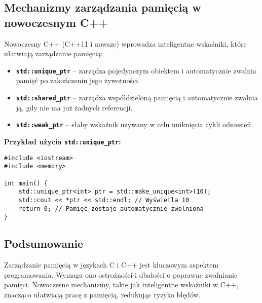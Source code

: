 \subsection{Mechanizmy zarządzania pamięcią w nowoczesnym C++}
Nowoczesny C++ (C++11 i nowsze) wprowadza inteligentne wskaźniki, które ułatwiają zarządzanie pamięcią:

\begin{itemize}
    \item \textbf{\texttt{std::unique\_ptr}} – zarządza pojedynczym obiektem i automatycznie zwalnia pamięć po zakończeniu jego żywotności.
    \item \textbf{\texttt{std::shared\_ptr}} – zarządza współdzieloną pamięcią i automatycznie zwalnia ją, gdy nie ma już żadnych referencji.
    \item \textbf{\texttt{std::weak\_ptr}} – słaby wskaźnik używany w celu uniknięcia cykli odniesień.
\end{itemize}

\textbf{Przykład użycia \texttt{std::unique\_ptr}:}

\begin{verbatim}
#include <iostream>
#include <memory>

int main() {
    std::unique_ptr<int> ptr = std::make_unique<int>(10);
    std::cout << *ptr << std::endl; // Wyświetla 10
    return 0; // Pamięć zostaje automatycznie zwolniona
}
\end{verbatim}

\subsection{Podsumowanie}
Zarządzanie pamięcią w językach C i C++ jest kluczowym aspektem programowania. Wymaga ono ostrożności i dbałości o poprawne zwalnianie pamięci. Nowoczesne mechanizmy, takie jak inteligentne wskaźniki w C++, znacząco ułatwiają pracę z pamięcią, redukując ryzyko błędów.
